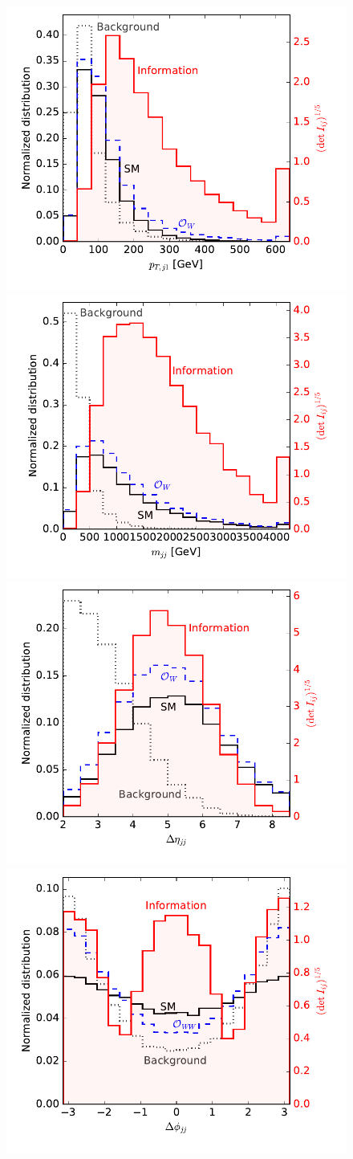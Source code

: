 \begin{figure}
  \includegraphics[height=0.45 \textwidth]{fig/information/wbf_tautau_information_over_ptj}%
  \includegraphics[height=0.45 \textwidth]{fig/information/wbf_tautau_information_over_mjj}\\%
  \includegraphics[height=0.45 \textwidth]{fig/information/wbf_tautau_information_over_deltaeta}%
  \includegraphics[height=0.45 \textwidth]{fig/information/wbf_tautau_information_over_deltaphi}%

\end{figure}

